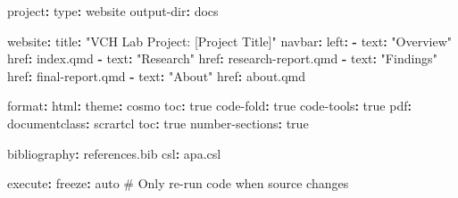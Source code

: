 \documentclass[
  oneside,
  open=any]{scrbook}
\newenvironment{Shaded}{\begin{snugshade}}{\end{snugshade}}
\newcommand{\AttributeTok}[1]{\textcolor[rgb]{0.40,0.45,0.13}{#1}}
\newcommand{\CharTok}[1]{\textcolor[rgb]{0.13,0.47,0.30}{#1}}
\newcommand{\CommentTok}[1]{\textcolor[rgb]{0.37,0.37,0.37}{#1}}
\newcommand{\FunctionTok}[1]{\textcolor[rgb]{0.28,0.35,0.67}{#1}}
\newcommand{\KeywordTok}[1]{\textcolor[rgb]{0.00,0.23,0.31}{\textbf{#1}}}
\newcommand{\StringTok}[1]{\textcolor[rgb]{0.13,0.47,0.30}{#1}}
\begin{document}
\begin{Shaded}
\begin{Highlighting}[]
\FunctionTok{project}\KeywordTok{:}
\AttributeTok{  }\FunctionTok{type}\KeywordTok{:}\AttributeTok{ website}
\AttributeTok{  }\FunctionTok{output{-}dir}\KeywordTok{:}\AttributeTok{ docs}

\FunctionTok{website}\KeywordTok{:}
\AttributeTok{  }\FunctionTok{title}\KeywordTok{:}\AttributeTok{ }\StringTok{"VCH Lab Project: [Project Title]"}
\AttributeTok{  }\FunctionTok{navbar}\KeywordTok{:}
\AttributeTok{    }\FunctionTok{left}\KeywordTok{:}
\AttributeTok{      }\KeywordTok{{-}}\AttributeTok{ }\FunctionTok{text}\KeywordTok{:}\AttributeTok{ }\StringTok{"Overview"}
\AttributeTok{        }\FunctionTok{href}\KeywordTok{:}\AttributeTok{ index.qmd}
\AttributeTok{      }\KeywordTok{{-}}\AttributeTok{ }\FunctionTok{text}\KeywordTok{:}\AttributeTok{ }\StringTok{"Research"}
\AttributeTok{        }\FunctionTok{href}\KeywordTok{:}\AttributeTok{ research{-}report.qmd}
\AttributeTok{      }\KeywordTok{{-}}\AttributeTok{ }\FunctionTok{text}\KeywordTok{:}\AttributeTok{ }\StringTok{"Findings"}
\AttributeTok{        }\FunctionTok{href}\KeywordTok{:}\AttributeTok{ final{-}report.qmd}
\AttributeTok{      }\KeywordTok{{-}}\AttributeTok{ }\FunctionTok{text}\KeywordTok{:}\AttributeTok{ }\StringTok{"About"}
\AttributeTok{        }\FunctionTok{href}\KeywordTok{:}\AttributeTok{ about.qmd}

\FunctionTok{format}\KeywordTok{:}
\AttributeTok{  }\FunctionTok{html}\KeywordTok{:}
\AttributeTok{    }\FunctionTok{theme}\KeywordTok{:}\AttributeTok{ cosmo}
\AttributeTok{    }\FunctionTok{toc}\KeywordTok{:}\AttributeTok{ }\CharTok{true}
\AttributeTok{    }\FunctionTok{code{-}fold}\KeywordTok{:}\AttributeTok{ }\CharTok{true}
\AttributeTok{    }\FunctionTok{code{-}tools}\KeywordTok{:}\AttributeTok{ }\CharTok{true}
\AttributeTok{  }\FunctionTok{pdf}\KeywordTok{:}
\AttributeTok{    }\FunctionTok{documentclass}\KeywordTok{:}\AttributeTok{ scrartcl}
\AttributeTok{    }\FunctionTok{toc}\KeywordTok{:}\AttributeTok{ }\CharTok{true}
\AttributeTok{    }\FunctionTok{number{-}sections}\KeywordTok{:}\AttributeTok{ }\CharTok{true}

\FunctionTok{bibliography}\KeywordTok{:}\AttributeTok{ references.bib}
\FunctionTok{csl}\KeywordTok{:}\AttributeTok{ apa.csl}

\FunctionTok{execute}\KeywordTok{:}
\AttributeTok{  }\FunctionTok{freeze}\KeywordTok{:}\AttributeTok{ auto}\CommentTok{  \# Only re{-}run code when source changes}
\end{Highlighting}
\end{Shaded}
\end{document}
